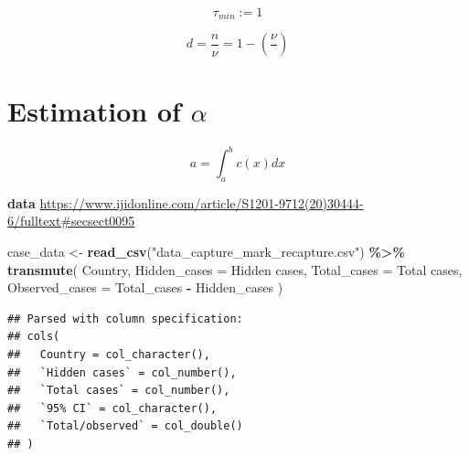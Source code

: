 \documentclass[
]{article}
\newenvironment{Shaded}{\begin{snugshade}}{\end{snugshade}}
\newcommand{\DataTypeTok}[1]{\textcolor[rgb]{0.13,0.29,0.53}{#1}}
\newcommand{\KeywordTok}[1]{\textcolor[rgb]{0.13,0.29,0.53}{\textbf{#1}}}
\newcommand{\NormalTok}[1]{#1}
\newcommand{\OperatorTok}[1]{\textcolor[rgb]{0.81,0.36,0.00}{\textbf{#1}}}
\newcommand{\StringTok}[1]{\textcolor[rgb]{0.31,0.60,0.02}{#1}}
\begin{document}
\[
\tau_{min} := 1
\]

\begin{equation}
d = \frac{n}{\nu} = 1 - \left( \frac{\nu}{} \right)
\end{equation}

\hypertarget{estimation-of-alpha}{%
\section{\texorpdfstring{Estimation of
\(\alpha\)}{Estimation of \textbackslash alpha}}\label{estimation-of-alpha}}

\begin{equation}
a = \int_a^b c(x)  dx 
\end{equation}

\textbf{data}
\url{https://www.ijidonline.com/article/S1201-9712(20)30444-6/fulltext\#secsect0095}

\begin{Shaded}
\begin{Highlighting}[]
\NormalTok{case\_data \textless{}{-}}\StringTok{ }\KeywordTok{read\_csv}\NormalTok{(}\StringTok{"data\_capture\_mark\_recapture.csv"}\NormalTok{) }\OperatorTok{\%\textgreater{}\%}
\StringTok{  }\KeywordTok{transmute}\NormalTok{(}
\NormalTok{    Country,}
    \DataTypeTok{Hidden\_cases =} \StringTok{\textasciigrave{}}\DataTypeTok{Hidden cases}\StringTok{\textasciigrave{}}\NormalTok{,}
    \DataTypeTok{Total\_cases =} \StringTok{\textasciigrave{}}\DataTypeTok{Total cases}\StringTok{\textasciigrave{}}\NormalTok{,}
    \DataTypeTok{Observed\_cases =} \StringTok{\textasciigrave{}}\DataTypeTok{Total\_cases}\StringTok{\textasciigrave{}} \OperatorTok{{-}}\StringTok{ }\NormalTok{Hidden\_cases}
\NormalTok{  )}
\end{Highlighting}
\end{Shaded}

\begin{verbatim}
## Parsed with column specification:
## cols(
##   Country = col_character(),
##   `Hidden cases` = col_number(),
##   `Total cases` = col_number(),
##   `95% CI` = col_character(),
##   `Total/observed` = col_double()
## )
\end{verbatim}
\end{document}
